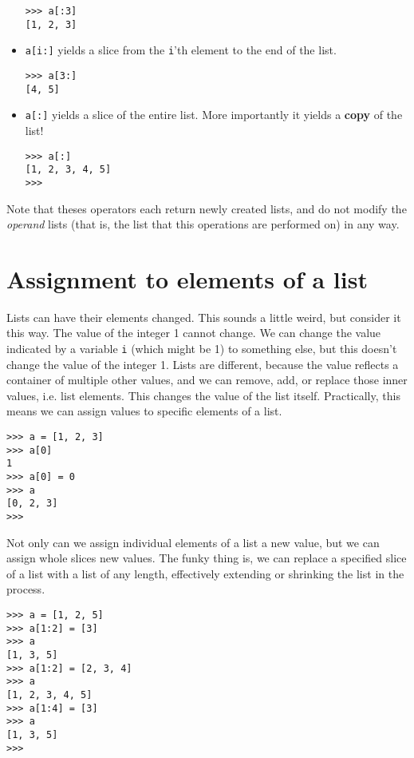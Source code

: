 \begin{itemize}
\begin{lstlisting}
>>> a[:3]
[1, 2, 3]
\end{lstlisting}
	\item 
\texttt{a[i:]} yields a slice from the \texttt{i}'th element to the    end of the list.
\begin{lstlisting}
>>> a[3:]
[4, 5]
\end{lstlisting}
	\item 
\texttt{a[:]} yields a slice of the entire list. More    importantly it yields a \textbf{copy} of the list!
\begin{lstlisting}
>>> a[:]
[1, 2, 3, 4, 5]
>>>
\end{lstlisting}
\end{itemize}

Note that theses operators each return newly created lists, and do   not modify the \textit{operand} lists (that is, the list that this operations are performed on) in any way. 








\section{Assignment to elements of a list}

Lists can have their elements changed.   This sounds a little weird, but consider it this way. The value of the   integer 1 cannot change. We can change the value indicated by a   variable \texttt{i} (which might be 1) to something else, but this doesn't   change the value of the integer 1. Lists are different, because the   value reflects a container of multiple other values, and we can remove,   add, or replace those inner values, i.e. list elements. This changes   the value of the list itself. Practically, this means we can assign   values to specific elements of a list.


\begin{lstlisting}
>>> a = [1, 2, 3]
>>> a[0]
1
>>> a[0] = 0
>>> a
[0, 2, 3]
>>> 
\end{lstlisting}

Not only can we assign individual elements of a list a new value,   but we can assign whole slices new values. The funky thing is, we can   replace a specified slice of a list with a list of any length,   effectively extending or shrinking the list in the process.


\begin{lstlisting}
>>> a = [1, 2, 5]
>>> a[1:2] = [3]
>>> a
[1, 3, 5]
>>> a[1:2] = [2, 3, 4]
>>> a
[1, 2, 3, 4, 5]
>>> a[1:4] = [3]
>>> a
[1, 3, 5]
>>> 
\end{lstlisting}

